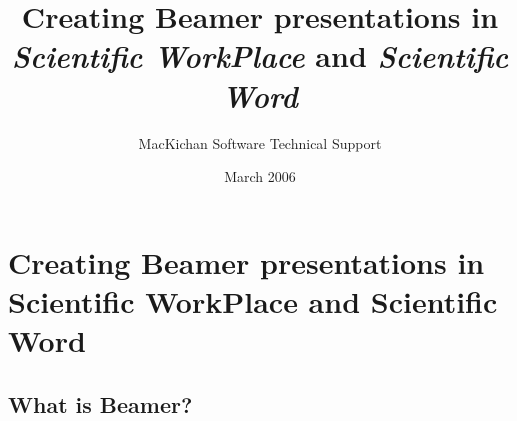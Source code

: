 \documentclass[notes=show,beamer]{beamer}
\begin{document}
\title[]{Creating Beamer presentations in \textsl{Scientific WorkPlace }and 
\textsl{Scientific Word}}
\author{MacKichan Software Technical Support}
\date{March 2006}
\maketitle

\section{Creating Beamer presentations in Scientific WorkPlace and
Scientific Word}

\subsection{What is Beamer?}
\end{document}
